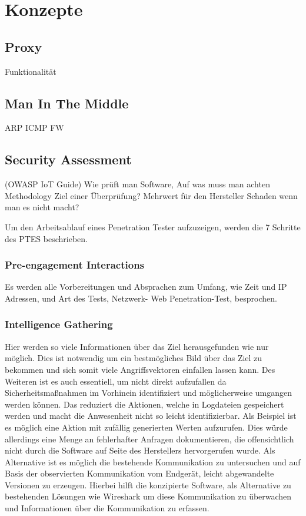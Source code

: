 \section{Konzepte}
    \subsection{Proxy}
        Funktionalität
    \subsection{Man In The Middle}
    ARP
    ICMP
    FW
    \subsection{Security Assessment}
        (OWASP IoT Guide) 
        Wie prüft man Software, Auf was muss man achten Methodology %
        Ziel einer Überprüfung?
        Mehrwert für den Hersteller
        Schaden wenn man es nicht macht?
        
        Um den Arbeitsablauf eines Penetration Tester aufzuzeigen, werden die 7 Schritte des \ac{PTES} \cite{hsiangchih_2019}
    beschrieben.
    \subsubsection{\glqq Pre-engagement Interactions\grqq{}}
        Es werden alle Vorbereitungen und Absprachen zum Umfang, wie Zeit und IP Adressen, und Art des Tests, Netzwerk- Web Penetration-Test, besprochen.
        
    \subsubsection{\glqq Intelligence Gathering\grqq{}}
        Hier werden so viele Informationen über das Ziel herausgefunden wie nur möglich. Dies ist notwendig um ein bestmögliches Bild über das Ziel zu bekommen und sich somit viele Angriffsvektoren einfallen lassen kann. Des Weiteren ist es auch essentiell, um nicht direkt aufzufallen da Sicherheitsmaßnahmen im Vorhinein identifiziert und möglicherweise umgangen werden können. Das reduziert die Aktionen, welche in Logdateien gespeichert werden und macht die Anwesenheit nicht so leicht identifizierbar. Als Beispiel ist es möglich eine Aktion mit zufällig generierten Werten aufzurufen. Dies würde allerdings eine Menge an fehlerhafter Anfragen dokumentieren, die offensichtlich nicht durch die Software auf Seite des Herstellers hervorgerufen wurde. Als Alternative ist es möglich die bestehende Kommunikation zu untersuchen und auf Basis der observierten Kommunikation vom Endgerät, leicht abgewandelte Versionen zu erzeugen. Hierbei hilft die konzipierte Software, als Alternative zu bestehenden Lösungen wie Wireshark um diese Kommunikation zu überwachen und Informationen über die Kommunikation zu erfassen.

